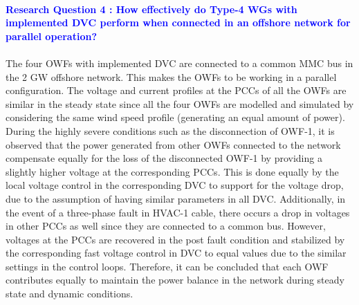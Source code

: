 \paragraph{\textcolor{blue}{Research Question 4 : How effectively do Type-4 \gls{WG}s with implemented \gls{DVC} perform when connected in an offshore network for parallel operation?}}

\paragraph{} The four \gls{OWF}s with implemented \gls{DVC} are connected to a common \gls{MMC} bus in the 2 GW offshore network. This makes the \gls{OWF}s to be working in a parallel configuration. The voltage and current profiles at the \gls{PCC}s of all the \gls{OWF}s are similar in the steady state since all the four \gls{OWF}s are modelled and simulated by considering the same wind speed profile (generating an equal amount of power). During the highly severe conditions such as the disconnection of \gls{OWF}-1, it is observed that the power generated from other \gls{OWF}s connected to the network compensate equally for the loss of the disconnected \gls{OWF}-1 by providing a slightly higher voltage at the corresponding \gls{PCC}s. This is done equally by the local voltage control in the corresponding \gls{DVC} to support for the voltage drop, due to the assumption of having similar parameters in all \gls{DVC}. Additionally, in the event of a three-phase fault in \gls{HVAC}-1 cable, there occurs a drop in voltages in other \gls{PCC}s as well since they are connected to a common bus. However, voltages at the \gls{PCC}s are recovered in the post fault condition and stabilized by the corresponding fast voltage control in \gls{DVC} to equal values due to the similar settings in the control loops. Therefore, it can be concluded that each \gls{OWF} contributes equally to maintain the power balance in the network during steady state and dynamic conditions.   

